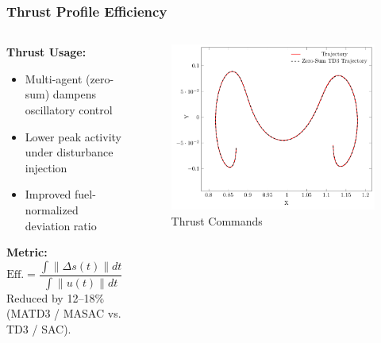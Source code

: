 \begin{frame}
  \frametitle{Thrust Profile Efficiency}
  \vspace{-0.4cm}
  \begin{columns}[T]
    \begin{column}{0.52\textwidth}
      \textbf{Thrust Usage:}
      \begin{itemize}\setlength{\itemsep}{3pt}
        \item Multi-agent (zero-sum) dampens oscillatory control
        \item Lower peak activity under disturbance injection
        \item Improved fuel-normalized deviation ratio
      \end{itemize}
      \textbf{Metric:}
      \[
        \text{Eff.} = \frac{\int \| \Delta s(t)\| dt}{\int \|u(t)\| dt}
      \]
      Reduced by 12--18\% (MATD3 / MASAC vs. TD3 / SAC).
    \end{column}
    \begin{column}{0.48\textwidth}
      \begin{figure}
        \centering
        \includegraphics[width=.95\linewidth]{../../Report/plots/td3/trajectory_force/plot_trajectory_zs}
        \caption{\scriptsize Thrust Commands}
      \end{figure}
    \end{column}
  \end{columns}
\end{frame}

